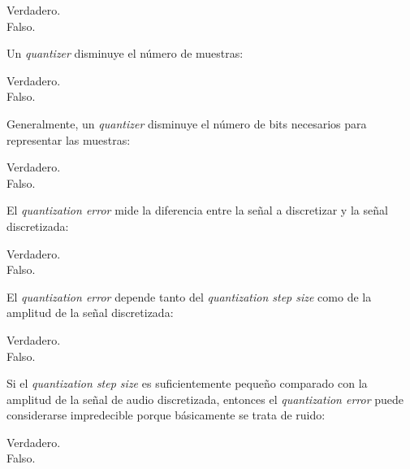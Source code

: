 \documentclass[legalpaper, 12pt, addpoints]{exam}
\begin{document}
\begin{questions}
\begin{oneparchoices}
  \choice Verdadero.\\
  \choice Falso.
\end{oneparchoices}
  
\vspace{0.10in}

\question Un \emph{quantizer} disminuye el número de muestras:

\begin{oneparchoices}
  \choice Verdadero.\\
  \choice Falso.
\end{oneparchoices}
  
\vspace{0.10in}

\question Generalmente, un \emph{quantizer} disminuye el número de bits necesarios
para representar las muestras:

\begin{oneparchoices}
  \choice Verdadero.\\
  \choice Falso.
\end{oneparchoices}
  
\vspace{0.10in}

\question El \emph{quantization error} mide la diferencia entre la
señal a discretizar y la señal discretizada:

\begin{oneparchoices}
  \choice Verdadero.\\
  \choice Falso.
\end{oneparchoices}
  
\vspace{0.10in}

\question El \emph{quantization error} depende tanto del
\emph{quantization step size} como de la amplitud de la señal discretizada:

\begin{oneparchoices}
  \choice Verdadero.\\
  \choice Falso.
\end{oneparchoices}
  
\vspace{0.10in}

\question Si el \emph{quantization step size} es suficientemente pequeño
comparado con la amplitud de la señal de audio discretizada, entonces
el \emph{quantization error} puede considerarse impredecible porque
básicamente se trata de ruido:

\begin{oneparchoices}
  \choice Verdadero.\\
  \choice Falso.
\end{oneparchoices}
  

\end{questions}
\end{document}

